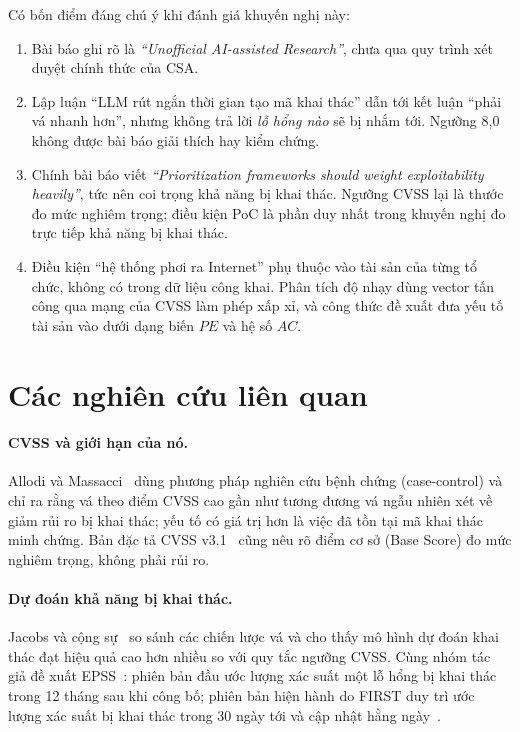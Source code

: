 \documentclass[runningheads]{llncs}
\begin{document}
Có bốn điểm đáng chú ý khi đánh giá khuyến nghị này:
\begin{enumerate}
\item Bài báo ghi rõ là \emph{``Unofficial AI-assisted Research''}, chưa qua quy trình
xét duyệt chính thức của CSA.
\item Lập luận ``LLM rút ngắn thời gian tạo mã khai thác'' dẫn tới kết luận ``phải vá
nhanh hơn'', nhưng không trả lời \emph{lỗ hổng nào} sẽ bị nhắm tới. Ngưỡng 8,0 không được
bài báo giải thích hay kiểm chứng.
\item Chính bài báo viết \emph{``Prioritization frameworks should weight exploitability
heavily''}, tức nên coi trọng khả năng bị khai thác. Ngưỡng CVSS lại là thước đo mức nghiêm
trọng; điều kiện PoC là phần duy nhất trong khuyến nghị đo trực tiếp khả năng bị khai thác.
\item Điều kiện ``hệ thống phơi ra Internet'' phụ thuộc vào tài sản của từng tổ chức, không
có trong dữ liệu công khai. Phân tích độ nhạy dùng vector tấn công qua mạng của CVSS làm
phép xấp xỉ, và công thức đề xuất đưa yếu tố tài sản vào dưới dạng biến $\mathit{PE}$ và hệ số $AC$.
\end{enumerate}

\section{Các nghiên cứu liên quan}\label{sec:lienquan}

\paragraph{CVSS và giới hạn của nó.}
Allodi và Massacci~\cite{allodi2014} dùng phương pháp nghiên cứu bệnh chứng (case-control)
và chỉ ra rằng vá theo điểm CVSS cao gần như tương đương vá ngẫu nhiên xét về giảm rủi ro
bị khai thác; yếu tố có giá trị hơn là việc đã tồn tại mã khai thác minh chứng. Bản đặc tả
CVSS v3.1~\cite{cvss31} cũng nêu rõ điểm cơ sở (Base Score) đo mức nghiêm trọng, không phải
rủi ro.

\paragraph{Dự đoán khả năng bị khai thác.}
Jacobs và cộng sự~\cite{jacobs2020} so sánh các chiến lược vá và cho thấy mô hình dự đoán
khai thác đạt hiệu quả cao hơn nhiều so với quy tắc ngưỡng CVSS. Cùng nhóm tác giả đề xuất
EPSS~\cite{jacobs2021}: phiên bản đầu ước lượng xác suất một lỗ hổng bị khai thác trong 12
tháng sau khi công bố; phiên bản hiện hành do FIRST duy trì ước lượng xác suất bị khai thác
trong 30 ngày tới và cập nhật hằng ngày~\cite{epss}.
\end{document}
